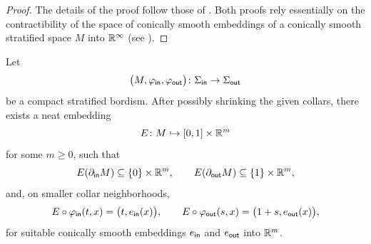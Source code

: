 \begin{proof}
    The details of the proof follow those of . Both proofs rely essentially on the contractibility of the space of conically smooth embeddings of a conically smooth stratified space $M$ into $\mathbb R^{\operatorname{\infty}}$ (see ). 
\end{proof}

\begin{lemma}\label{ch5:: lem: normalized neat embedding}
    Let 
    \begin{equation}
        \big(M,\varphi_{\sf in},\varphi_{\sf out}\big)\colon \Sigma_{\sf in} \rightarrow \Sigma_{\sf out}
    \end{equation}
    be a compact stratified bordism. After possibly shrinking the given collars, there exists a neat embedding
    \begin{equation}
        E\colon M \hookrightarrow [0,1]\times \mathbb R^{m}
    \end{equation}
    for some $m\geq 0$, such that
    \begin{equation}
        E(\partial_{\sf in}M)\subseteq \{0\}\times \mathbb R^{m}, \qquad E(\partial_{\sf out}M)\subseteq \{1\}\times \mathbb R^{m},
    \end{equation}
    and, on smaller collar neighborhoods,
    \begin{equation}
        E\circ \varphi_{\sf in}(t,x)=\big(t,e_{\sf in}(x)\big), \qquad E\circ \varphi_{\sf out}(s,x)=\big(1+s,e_{\sf out}(x)\big),
    \end{equation}
    for suitable conically smooth embeddings $e_{\sf in}$ and $e_{\sf out}$ into $\mathbb R^{m}$.
\end{lemma}
